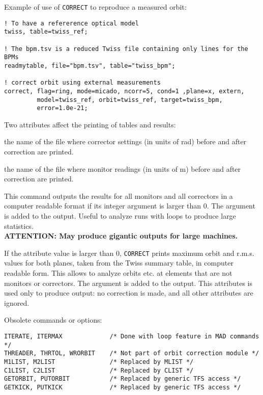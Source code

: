 Example of use of \texttt{CORRECT} to reproduce a measured orbit: 
\begin{verbatim}
! To have a refererence optical model
twiss, table=twiss_ref;

! The bpm.tsv is a reduced Twiss file containing only lines for the BPMs
readmytable, file="bpm.tsv", table="twiss_bpm";

! correct orbit using external measurements
correct, flag=ring, mode=micado, ncorr=5, cond=1 ,plane=x, extern,
         model=twiss_ref, orbit=twiss_ref, target=twiss_bpm, 
         error=1.0e-21;
\end{verbatim}


Two attributes affect the printing of tables and results: 
\begin{madlist}
    the name of the file where corrector settings (in units of rad)
     before and after correction are printed.

    the name of the file where monitor readings (in units of m) before
     and after correction are printed.

    This command outputs the results for all monitors and
     all correctors in a computer readable format if its integer
     argument is larger than 0. The argument is added to the
     output. Useful to analyze runs with loops to produce large
     statistics. \\
     \textbf{ATTENTION: May produce gigantic outputs for large
       machines.} 

    If the attribute value is larger than 0, \texttt{CORRECT}
     prints maximum orbit and r.m.s. values for both planes, taken from the
     Twiss summary table, in computer readable form. This allows to analyze
     orbits etc. at elements that are not monitors or correctors. The
     argument is added to the output.  This attributes is used only to produce 
     output: no correction is made, and all other attributes are ignored.  
\end{madlist}

Obsolete commands or options:
\begin{verbatim}
ITERATE, ITERMAX             /* Done with loop feature in MAD commands */
THREADER, THRTOL, WRORBIT    /* Not part of orbit correction module */
M1LIST, M2LIST               /* Replaced by MLIST */
C1LIST, C2LIST               /* Replaced by CLIST */
GETORBIT, PUTORBIT           /* Replaced by generic TFS access */
GETKICK, PUTKICK             /* Replaced by generic TFS access */
\end{verbatim}

